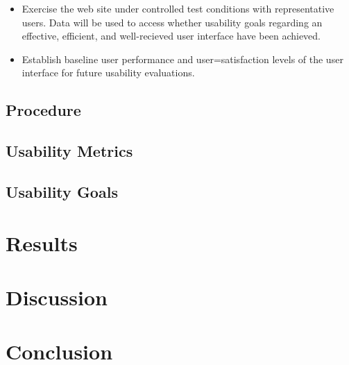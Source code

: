 \documentclass[10pt]{article}
\begin{document}
\begin{multicols}{2}
\begin{itemize}
\item Exercise the web site under controlled test conditions with representative users. Data will be used to access whether usability goals regarding an effective, efficient, and well-recieved user interface have been achieved.

\item Establish baseline user performance and user=satisfaction levels of the user interface for future usability evaluations.
\end{itemize}

\subsection*{Procedure}
\subsection*{Usability Metrics}
\subsection*{Usability Goals}

\section*{Results}
\section*{Discussion}
\section*{Conclusion}
\end{multicols}
\end{document}

